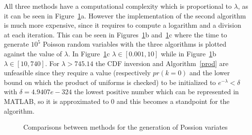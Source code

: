 \documentclass[10pt]{article}
\begin{document}
All three methods have a computational complexity which is proportional to $\lambda$, as it can be seen in Figure~\ref{fig:poi_iter}a. However the implementation of the second algorithm is much more expensive, since it requires to compute a logarithm and a division at each iteration. This can be seen in Figures~\ref{fig:poi_iter}b and~\ref{fig:poi_iter}c where the time to generate $10^5$ Poisson random variables with the three algorithms is plotted against the value of $\lambda$. In Figure~\ref{fig:poi_iter}c $\lambda \in [0.001, 10]$ while in Figure~\ref{fig:poi_iter}b $\lambda \in [10, 740]$. For $\lambda > 745.14$ the CDF inversion and Algorithm~\ref{prod} are unfeasible since they require a value (respectively $pr(k=0)$ and the lower bound on which the product of uniforms is checked) to be initialized to $e^{-\lambda} < \delta$ with $\delta = 4.9407e-324$ the lowest positive number which can be represented in MATLAB, so it is approximated to 0 and this becomes a standpoint for the algorithm.


\begin{figure}[h]
  \centering
  \caption{Comparisons between methods for the generation of Possion variates}
  \label{fig:poi_iter}
\end{figure}
\end{document}
